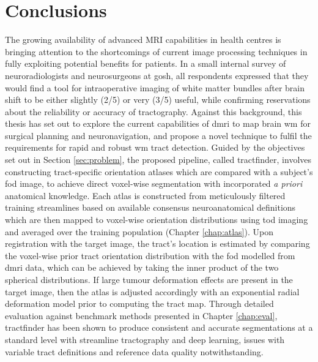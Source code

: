 \chapter{Conclusions}
\label{chapterlabel6}

The growing availability of advanced MRI capabilities in health centres is bringing attention to the shortcomings of current image processing techniques in fully exploiting potential benefits for patients.
In a small internal survey of neuroradiologists and neurosurgeons at \gls{gosh}, all respondents expressed that they would find a tool for intraoperative imaging of white matter bundles after brain shift to be either slightly (2/5) or very (3/5) useful, while confirming reservations about the reliability or accuracy of tractography.
Against this background, this thesis has set out to explore the current capabilities of \gls{dmri} to map brain \gls{wm} for surgical planning and neuronavigation, and propose a novel technique to fulfil the requirements for rapid and robust \gls{wm} tract detection.
Guided by the objectives set out in Section \ref{sec:problem}, the proposed pipeline, called tractfinder, involves constructing tract-specific orientation atlases which are compared with a subject's \gls{fod} image, to achieve direct voxel-wise segmentation with incorporated \textit{a priori} anatomical knowledge.
Each atlas is constructed from meticulously filtered training streamlines based on available consensus neuroanatomical definitions which are then mapped to voxel-wise orientation distributions using \gls{tod} imaging and averaged over the training population (Chapter \ref{chap:atlas}).
Upon registration with the target image, the tract's location is estimated by comparing the voxel-wise prior tract orientation distribution with the \gls{fod} modelled
from \gls{dmri} data, which can be achieved by taking the inner product of the two spherical distributions.
If large tumour deformation effects are present in the target image, then the atlas is adjusted accordingly with an exponential radial deformation model prior to computing the tract map.
Through detailed evaluation against benchmark methods presented in Chapter \ref{chap:eval}, tractfinder has been shown to produce consistent and accurate segmentations at a standard level with streamline tractography and deep learning, issues with variable tract definitions and reference data quality notwithstanding.

